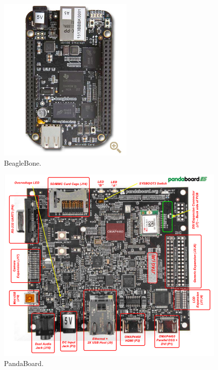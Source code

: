   \begin{figure}[htbp]
   \centering
   \includegraphics[scale=0.7,keepaspectratio=true]{./imagenes/beaglebone.jpg}
   \caption{BeagleBone.}
   \label{figura:BeagleBone}
  \end{figure}

  \begin{figure}[htbp]
   \centering
   \includegraphics[scale=0.4,keepaspectratio=true]{./imagenes/pandaboard.png}
   \caption{PandaBoard.}
   \label{figura:PandaBoard}
  \end{figure}

